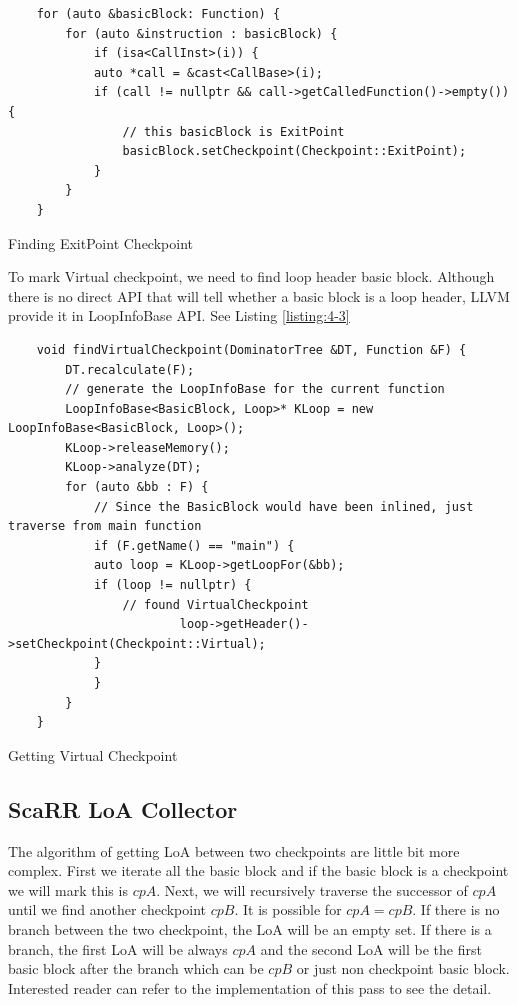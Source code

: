 \begin{listing}
\begin{verbatim}
    for (auto &basicBlock: Function) {
        for (auto &instruction : basicBlock) {
            if (isa<CallInst>(i)) {
            auto *call = &cast<CallBase>(i);
            if (call != nullptr && call->getCalledFunction()->empty()) {
                // this basicBlock is ExitPoint
                basicBlock.setCheckpoint(Checkpoint::ExitPoint);
            } 
        }
    } 
\end{verbatim}
\caption{Finding ExitPoint Checkpoint}    
\label{listing:4-2}
\end{listing}

To mark Virtual checkpoint, we need to find loop header basic block. Although there is no direct API that will tell whether a basic block is a loop header, LLVM provide it in LoopInfoBase API. See Listing \ref{listing:4-3}

\begin{listing}
\begin{verbatim}
    void findVirtualCheckpoint(DominatorTree &DT, Function &F) {
        DT.recalculate(F);
        // generate the LoopInfoBase for the current function
        LoopInfoBase<BasicBlock, Loop>* KLoop = new LoopInfoBase<BasicBlock, Loop>();
        KLoop->releaseMemory();
        KLoop->analyze(DT);
        for (auto &bb : F) {
            // Since the BasicBlock would have been inlined, just traverse from main function
            if (F.getName() == "main") {
            auto loop = KLoop->getLoopFor(&bb);
            if (loop != nullptr) {
                // found VirtualCheckpoint
                        loop->getHeader()->setCheckpoint(Checkpoint::Virtual);
            }
            }
        }
    }
\end{verbatim}
\caption{Getting Virtual Checkpoint }    
\label{listing:4-3}
\end{listing}

\subsection{ScaRR LoA Collector}

The algorithm of getting LoA between two checkpoints are little bit more complex. First we iterate all the basic block and if the basic block is a checkpoint we will mark this is $cpA$. Next, we will recursively traverse the successor of $cpA$ until we find another checkpoint $cpB$. It is possible for $cpA = cpB$. If there is no branch between the two checkpoint, the LoA will be an empty set. If there is a branch, the first LoA will be always $cpA$ and the second LoA will be the first basic block after the branch which can be $cpB$ or just non checkpoint  basic block. Interested reader can refer to the implementation of this pass to see the detail.

